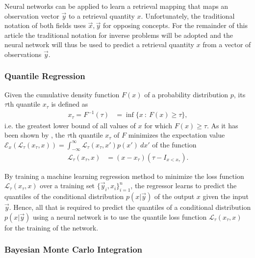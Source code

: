 \documentclass[journal abbreviation, manuscript]{copernicus}
\begin{document}
    Neural networks can be applied to learn a retrieval mapping
    that maps an observation vector $\vec{y}$ to a retrieval quantity $x$.
    Unfortunately, the traditional notation of both fields uses $\vec{x}, \vec{y}$
    for opposing concepts. For the remainder of this article the
    traditional notation for inverse problems will be adopted and the neural network
    will thus be used to predict a retrieval quantity $x$ from a vector of
    observations $\vec{y}$.

\subsubsection{Quantile Regression}

    Given the cumulative density function $F(x)$ of a probability distribution
    $p$, its $\tau\text{th}$ quantile $x_\tau$ is defined as
    \begin{align}
    x_\tau = F^{-1}(\tau) &= \inf \{x \: : \: F(x) \geq \tau \},
    \end{align}
    i.e. the greatest lower bound of all values of $x$ for which $F(x) \geq \tau$.
    As it has been shown by \citep{koenker}, the $\tau\text{th}$ quantile $x_\tau$ of $F$
    minimizes the expectation value $\mathcal{E}_x\left ( \mathcal{L}_\tau(x_\tau, x) \right) = \int_{-\infty}^\infty \mathcal{L}_\tau(x_\tau, x') p(x') \: dx'$
    of the function
    \begin{align}\label{eq:quantile_loss}
      \mathcal{L}_{\tau}(x_\tau, x) &=  (x - x_\tau)(\tau - I_{x < x_\tau}).
    \end{align}

    By training a machine learning regression method to minimize the
    loss function $\mathcal{L}_\tau(x_\tau, x)$ over a training set
    $\{\vec{y}_i, x_i\}_{i = 1}^n$, the regressor learns to predict
    the quantiles of the conditional distribution $p(x | \vec{y})$
    of the output $x$ given the input $\vec{y}$. Hence, all that is required
    to predict the quantiles of a conditional distribution $p(x | \vec{y})$
    using a neural network is to use the quantile loss function
    $\mathcal{L}_\tau(x_\tau, x)$ for the training of the network.
    
    

\subsubsection{Bayesian Monte Carlo Integration}
\end{document}
